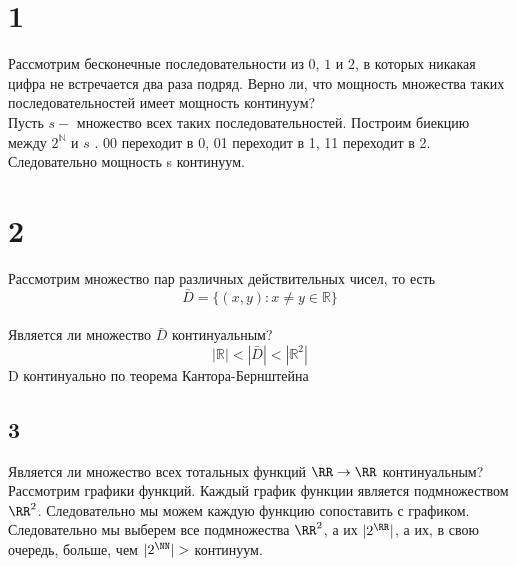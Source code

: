 

	\section*{1}
Рассмотрим бесконечные последовательности из $0$, $1$ и $2$, в
которых никакая цифра не встречается два раза подряд. Верно ли, что
мощность множества таких последовательностей имеет мощность континуум? \\
Пусть $s -$ множество всех таких последовательностей. Построим биекцию между $2^{\mathbb{N}} \text{ и } s$ . 00 переходит в 0, 01 переходит в 1, 11 переходит в 2. Следовательно мощность s континуум.
\section*{2}
Рассмотрим множество пар различных действительных чисел, то есть \\
$$\bar D  = \{(x,y) : x\ne y \in \mathbb{R} \}$$  \\Является ли множество $\bar D$ континуальным?
$$ |\mathbb{R}| < |\bar D| < |\mathbb{R}^2| $$  D континуально по теорема Кантора-Бернштейна
\subsection*{3}
Является ли множество всех тотальных функций $\RR\to\RR$ континуальным?
Рассмотрим графики функций. Каждый график функции является подмножеством $\RR^2$. Следовательно мы можем каждую функцию сопоставить с графиком. Следовательно мы выберем все подмножества $\RR^2$, а их $|2^{\RR}|$, а их, в свою очередь, больше, чем $|2^{\NN}|>$ континуум.
